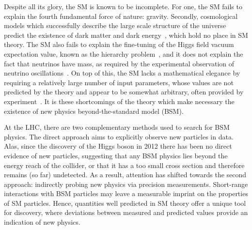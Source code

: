 Despite all its glory, the SM is known to be incomplete. For one, the SM fails to explain the fourth fundamental force of nature: gravity. 
Secondly, cosmological models which successfully describe the large scale structure of the universe predict the existence of dark matter and dark energy~\cite{Aghanim:2018eyx}, which hold no place in SM theory. The SM also fails to explain the fine-tuning of the Higgs field vacuum expectation value, known as the hierarchy problem~\cite{PhysRevD.13.974,PhysRevD.20.2619}, and it does not explain the fact that neutrinos have mass, as required by the experimental observation of neutrino oscillations~\cite{Fukuda:1998mi}. On top of this, the SM lacks a mathematical elegance by requiring a relatively large number of input parameters, whose values are not predicted by the theory and appear to be somewhat arbitrary, often provided by experiment~\cite{Zyla:2020zbs}. It is these shortcomings of the theory which make necessary the existence of new physics beyond-the-standard model (BSM).

At the LHC, there are two complementary methods used to search for BSM physics. The direct approach aims to explicitly observe new particles in data. Alas, since the discovery of the Higgs boson in 2012 there has been no direct evidence of new particles, suggesting that any BSM physics lies beyond the energy reach of the collider, or that it has a too small cross section and therefore remains (so far) undetected. As a result, attention has shifted towards the second approach: indirectly probing new physics via precision measurements. Short-range interactions with BSM particles may leave a measurable imprint on the properties of SM particles. Hence, quantities well predicted in SM theory offer a unique tool for discovery, where deviations between measured and predicted values provide an indication of new physics. 

